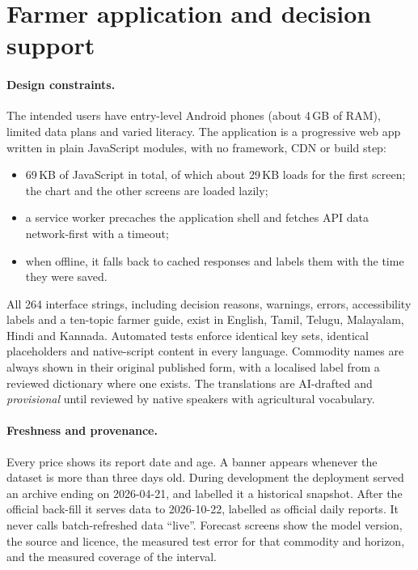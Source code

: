 \section{Farmer application and decision support}\label{sec:app}

\paragraph{Design constraints.}
The intended users have entry-level Android phones (about 4\,GB of RAM), limited data plans and varied literacy.
The application is a progressive web app written in plain JavaScript modules, with no framework, CDN or build step:
\begin{itemize}
  \item 69\,KB of JavaScript in total, of which about 29\,KB loads for the first screen; the chart and the other screens are loaded lazily;
  \item a service worker precaches the application shell and fetches API data network-first with a timeout;
  \item when offline, it falls back to cached responses and labels them with the time they were saved.
\end{itemize}
All 264 interface strings, including decision reasons, warnings, errors, accessibility labels and a ten-topic farmer guide, exist in English, Tamil, Telugu, Malayalam, Hindi and Kannada.
Automated tests enforce identical key sets, identical placeholders and native-script content in every language.
Commodity names are always shown in their original published form, with a localised label from a reviewed dictionary where one exists.
The translations are AI-drafted and \emph{provisional} until reviewed by native speakers with agricultural vocabulary.

\paragraph{Freshness and provenance.}
Every price shows its report date and age.
A banner appears whenever the dataset is more than three days old.
During development the deployment served an archive ending on 2026-04-21, and labelled it a historical snapshot. After the official back-fill it serves data to 2026-10-22, labelled as official daily reports. It never calls batch-refreshed data ``live''.
Forecast screens show the model version, the source and licence, the measured test error for that commodity and horizon, and the measured coverage of the interval.

